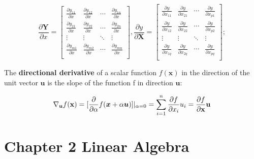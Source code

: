 \documentclass[12pt]{article}
\numberwithin{equation}{section}
\begin{document}
\begin{equation}
	\frac{\partial \mathbf{Y}}{\partial x} =
	\begin{bmatrix}
		\frac{\partial y_{11}}{\partial x} & \frac{\partial y_{12}}{\partial x} & \cdots & \frac{\partial y_{1n}}{\partial x}\\
		\frac{\partial y_{21}}{\partial x} & \frac{\partial y_{22}}{\partial x} & \cdots & \frac{\partial y_{2n}}{\partial x}\\
		\vdots & \vdots & \ddots & \vdots\\
		\frac{\partial y_{m1}}{\partial x} & \frac{\partial y_{m2}}{\partial x} & \cdots & \frac{\partial y_{mn}}{\partial x}\\
	\end{bmatrix},
	\frac{\partial y}{\partial \mathbf{X}} =
	\begin{bmatrix}
		\frac{\partial y}{\partial x_{11}} & \frac{\partial y}{\partial x_{21}} & \cdots & \frac{\partial y}{\partial x_{p1}}\\
		\frac{\partial y}{\partial x_{12}} & \frac{\partial y}{\partial x_{22}} & \cdots & \frac{\partial y}{\partial x_{p2}}\\
		\vdots & \vdots & \ddots & \vdots\\
		\frac{\partial y}{\partial x_{1q}} & \frac{\partial y}{\partial x_{2q}} & \cdots & \frac{\partial y}{\partial x_{pq}}\\
	\end{bmatrix};
\end{equation} \par
The \textbf{directional derivative} of a scalar function $f(\mathbf{x})$ in the direction of the unit vector $\mathbf{u}$ is the slope of the function f in direction $\mathbf{u}$: \par
	\begin{equation}
		\nabla_{\bold{u}}{f}(\bold{x}) = [\frac{\partial}{\partial \alpha}f(\bm{x}+\alpha \bm{u})]|_{\alpha=0}
		=\sum_{i=1}^{n}\frac{\partial f}{\partial x_i}u_i=\frac{\partial f}{\partial \mathbf{x}}\mathbf{u}
	\end{equation}
\section{Chapter 2 Linear Algebra}
\end{document}

